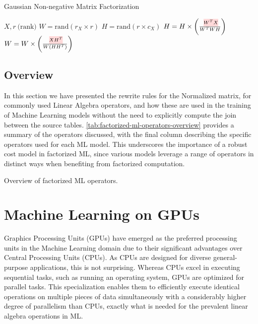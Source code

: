 \begin{algorithm}[ht]
  \caption[Gaussian NMF]{Gaussian Non-negative Matrix Factorization
    ~\cite{morpheus}}\label{alg:gaussian-nmf}
  \begin{algorithmic}
    \Require $X, r\ \text{(rank)}$
    \State $W = \text{rand}(r_X \times r)$ 
    \State $H = \text{rand}(r \times c_X)$ 
    \State $H = H \times \left(\frac{\text{\red{$W^T X$}}}{W^T W H}\right)$
    \State $W = W \times \left(\frac{\text{\red{$X H^T$}}}{W(H H^T)}\right)$
    \EndFor
  \end{algorithmic}
\end{algorithm}


\subsection{Overview}
\label{subsec:factorized-ml-summary}
In this section we have presented the rewrite rules for the Normalized matrix, for commonly used Linear Algebra operators, and how these are used in the training of Machine Learning models without the need to explicitly compute the join between the source tables. \autoref{tab:factorized-ml-operators-overview}  provides a summary of the operators discussed, with the final column describing the specific operators used for each ML model. This underscores the importance of a robust cost model in factorized ML, since various models leverage a range of operators in distinct ways when benefiting from factorized computation.

\begin{table}[ht]
  \small
  \resizebox{\textwidth}{!}{%
    }
  \caption{Overview of factorized ML operators.}
  \label{tab:factorized-ml-operators-overview}
\end{table}

\section{Machine Learning on GPUs}
\label{sec:2-ml-on-gpu}
Graphics Processing Units (GPUs) have emerged as the preferred processing units in the Machine Learning domain due to their significant advantages over Central Processing Units (CPUs). As CPUs are designed for diverse general-purpose applications, this is not surprising. Whereas CPUs excel in executing sequential tasks, such as running an operating system, GPUs are optimized for parallel tasks. This specialization enables them to efficiently execute identical operations on multiple pieces of data simultaneously with a considerably higher degree of parallelism than CPUs, exactly what is needed for the prevalent linear algebra operations in ML.

